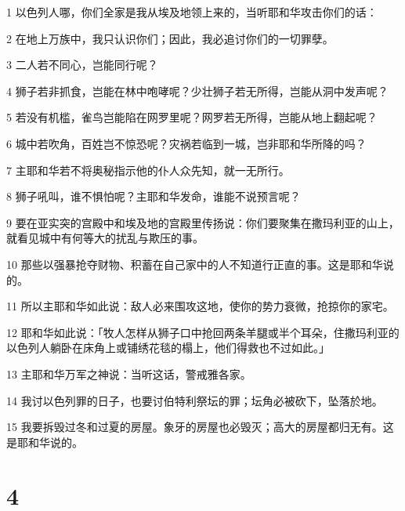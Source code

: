 \par 1 以色列人哪，你们全家是我从埃及地领上来的，当听耶和华攻击你们的话：
\par 2 在地上万族中，我只认识你们；因此，我必追讨你们的一切罪孽。
\par 3 二人若不同心，岂能同行呢？
\par 4 狮子若非抓食，岂能在林中咆哮呢？少壮狮子若无所得，岂能从洞中发声呢？
\par 5 若没有机槛，雀鸟岂能陷在网罗里呢？网罗若无所得，岂能从地上翻起呢？
\par 6 城中若吹角，百姓岂不惊恐呢？灾祸若临到一城，岂非耶和华所降的吗？
\par 7 主耶和华若不将奥秘指示他的仆人众先知，就一无所行。
\par 8 狮子吼叫，谁不惧怕呢？主耶和华发命，谁能不说预言呢？
\par 9 要在亚实突的宫殿中和埃及地的宫殿里传扬说：你们要聚集在撒玛利亚的山上，就看见城中有何等大的扰乱与欺压的事。
\par 10 那些以强暴抢夺财物、积蓄在自己家中的人不知道行正直的事。这是耶和华说的。
\par 11 所以主耶和华如此说：敌人必来围攻这地，使你的势力衰微，抢掠你的家宅。
\par 12 耶和华如此说：「牧人怎样从狮子口中抢回两条羊腿或半个耳朵，住撒玛利亚的以色列人躺卧在床角上或铺绣花毯的榻上，他们得救也不过如此。」
\par 13 主耶和华万军之神说：当听这话，警戒雅各家。
\par 14 我讨以色列罪的日子，也要讨伯特利祭坛的罪；坛角必被砍下，坠落於地。
\par 15 我要拆毁过冬和过夏的房屋。象牙的房屋也必毁灭；高大的房屋都归无有。这是耶和华说的。

\chapter{4}

